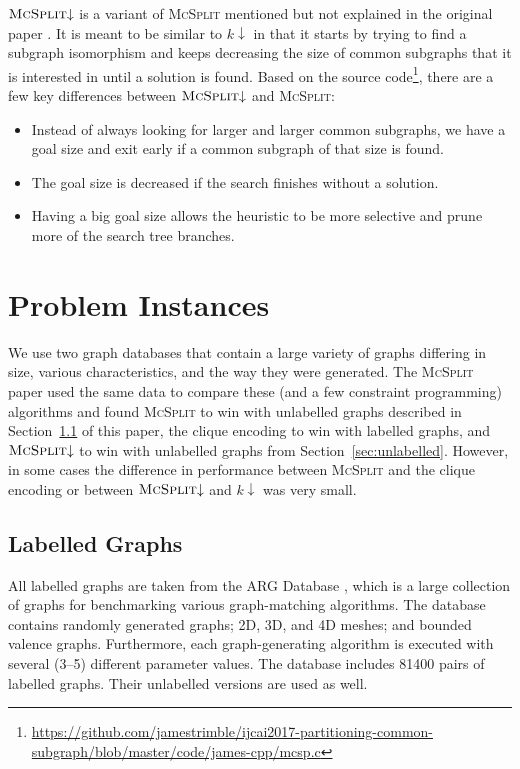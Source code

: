 \documentclass{l4proj}
\theoremstyle{definition}
\theoremstyle{remark}
\begin{document}
$\textsc{McSplit} {\downarrow}$ is a variant of \textsc{McSplit} mentioned but not
explained in the original paper \cite{DBLP:conf/ijcai/McCreeshPT17}. It is meant
to be similar to $k{\downarrow}$ in that it starts by trying to find a subgraph
isomorphism and keeps decreasing the size of common subgraphs that it is
interested in until a solution is found. Based on the source
code\footnote{\url{https://github.com/jamestrimble/ijcai2017-partitioning-common-subgraph/blob/master/code/james-cpp/mcsp.c}},
there are a few key differences between $\textsc{McSplit} {\downarrow}$ and
\textsc{McSplit}:
\begin{itemize}
\item Instead of always looking for larger and larger common subgraphs, we have
  a goal size and exit early if a common subgraph of that size is found.
\item The goal size is decreased if the search finishes without a solution.
\item Having a big goal size allows the heuristic to be more selective and prune
  more of the search tree branches.
\end{itemize}

\chapter{Problem Instances} \label{chapter:problems}

We use two graph databases that contain a large variety of graphs differing in
size, various characteristics, and the way they were generated. The
\textsc{McSplit} paper \cite{DBLP:conf/ijcai/McCreeshPT17} used the same
data to compare these (and a few constraint programming) algorithms and
found \textsc{McSplit} to win with unlabelled graphs described in
Section~\ref{sec:labelled} of this paper, the clique encoding to win with
labelled graphs, and $\textsc{McSplit}{\downarrow}$ to win with unlabelled
graphs from Section~\ref{sec:unlabelled}. However, in some cases the difference
in performance between \textsc{McSplit} and the clique encoding or between
$\textsc{McSplit}{\downarrow}$ and $k{\downarrow}$ was very small.

\section{Labelled Graphs} \label{sec:labelled}
All labelled graphs are taken from the ARG Database \cite{foggia2001-2,
  DBLP:journals/prl/SantoFSV03}, which is a large collection of graphs for
benchmarking various graph-matching algorithms. The database contains randomly
generated graphs; 2D, 3D, and 4D meshes; and bounded valence graphs.
Furthermore, each graph-generating algorithm is executed with several (3--5)
different parameter values. The database includes 81400 pairs of labelled
graphs. Their unlabelled versions are used as well.
\end{document}
